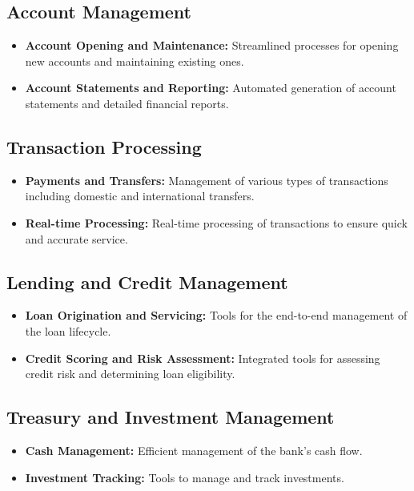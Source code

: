 \documentclass[a4paper,12pt]{report}
\begin{document}
	\subsection{Account Management}
	\begin{itemize}
		\item \textbf{Account Opening and Maintenance:} Streamlined processes for opening new accounts and maintaining existing ones.
		\item \textbf{Account Statements and Reporting:} Automated generation of account statements and detailed financial reports.
	\end{itemize}
	
	\subsection{Transaction Processing}
	\begin{itemize}
		\item \textbf{Payments and Transfers:} Management of various types of transactions including domestic and international transfers.
		\item \textbf{Real-time Processing:} Real-time processing of transactions to ensure quick and accurate service.
	\end{itemize}
	
	\subsection{Lending and Credit Management}
	\begin{itemize}
		\item \textbf{Loan Origination and Servicing:} Tools for the end-to-end management of the loan lifecycle.
		\item \textbf{Credit Scoring and Risk Assessment:} Integrated tools for assessing credit risk and determining loan eligibility.
	\end{itemize}
	
	\subsection{Treasury and Investment Management}
	\begin{itemize}
		\item \textbf{Cash Management:} Efficient management of the bank’s cash flow.
		\item \textbf{Investment Tracking:} Tools to manage and track investments.
	\end{itemize}
	
\end{document}
